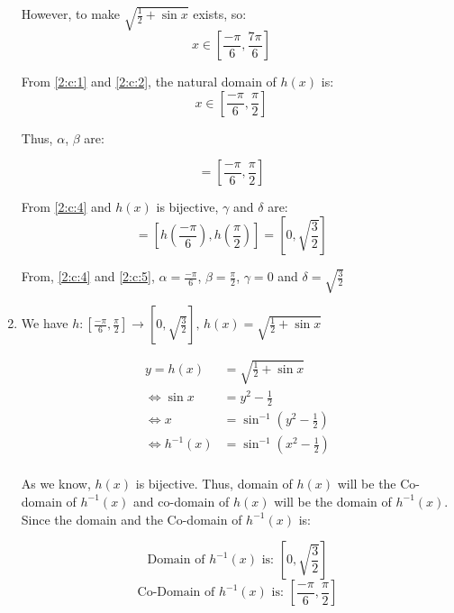 \documentclass{article}
\begin{document}
\begin{enumerate}[label=({\alph*})]
        However, to make \(\sqrt{\frac{1}{2} + \sin{x}}\) exists, so:
        \begin{equation}
            x \in [\frac{-\pi}{6}, \frac{7\pi}{6}] \quad \label{2:c:2}
        \end{equation}

        From \eqref{2:c:1} and \eqref{2:c:2}, the natural domain of \(h(x)\) is:
        \begin{equation}
            x \in [\frac{-\pi}{6}, \frac{\pi}{2}] \quad \label{2:c:3}
        \end{equation}

        Thus, \(\alpha\), \(\beta\) are:

        \begin{equation}
            [\alpha, \beta] = [\frac{-\pi}{6}, \frac{\pi}{2}] \quad \label{2:c:4}
        \end{equation}

        From \eqref{2:c:4} and \(h(x)\) is bijective, \(\gamma\) and \(\delta\) are:
        \begin{equation}
            [\gamma, \delta] = [h(\frac{-\pi}{6}), h(\frac{\pi}{2})] = [0, \sqrt{\frac{3}{2}}]\quad \label{2:c:5}
        \end{equation}

        From, \eqref{2:c:4} and \eqref{2:c:5}, \(\alpha = \frac{-\pi}{6}\), \(\beta = \frac{\pi}{2}\), \(\gamma = 0\) and \(\delta = \sqrt{\frac{3}{2}}\)


        \item
        We have \(h: [\frac{-\pi}{6}, \frac{\pi}{2}] \to [0, \sqrt{\frac{3}{2}}]\text{, } h(x) = \sqrt{\frac{1}{2} + \sin{x}}\)

        \begin{align*}
            y = h(x) &= \sqrt{\frac{1}{2} + \sin{x}}\\
            \Leftrightarrow \sin{x} &= y^2 - \frac{1}{2}\\
            \Leftrightarrow x &= \sin^{-1}{(y^2 - \frac{1}{2})}\\
            \Leftrightarrow h^{-1}(x) &= \sin^{-1}{(x^2 - \frac{1}{2})}\\
        \end{align*}


        As we know, \(h(x)\) is bijective. Thus, domain of \(h(x)\) will be the Co-domain of \(h^{-1}(x)\) and co-domain of \(h(x)\) will be the domain of \(h^{-1}(x)\). Since the domain and the Co-domain of \(h^{-1}(x)\) is:

        \[\text{Domain of } h^{-1}(x) \text{ is: }  [0, \sqrt{\frac{3}{2}}]\]
        \[\text{Co-Domain of } h^{-1}(x) \text{ is: }  [\frac{-\pi}{6}, \frac{\pi}{2}]\]
    \end{enumerate}
\end{document}

